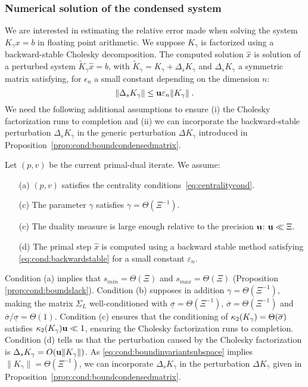 \subsubsection{Numerical solution of the condensed system}
We are interested in estimating the relative error
made when solving the system $K_\gamma x = b$ in floating
point arithmetic. We suppose $K_\gamma$ is factorized using
a backward-stable Cholesky decomposition. The computed
solution $\widehat{x}$ is solution of a perturbed system
$\widetilde{K}_\gamma \widehat{x} = b$, with $\widetilde{K}_\gamma
= K_\gamma + \Delta_s K_\gamma$ and $\Delta_s K_\gamma$ a symmetric matrix satisfying,
for $\epsilon_n$ a small constant depending on the dimension $n$:
\begin{equation}
  \label{eq:cond:backwardstable}
\|\Delta_s K_\gamma\| \leq \mathbf{u} \varepsilon_n \|K_\gamma\| \;.
\end{equation}
We need the following additional assumptions to
ensure (i) the Cholesky factorization runs to completion
and (ii) we can incorporate the backward-stable perturbation $\Delta_s K_\gamma$
in the generic perturbation $\Delta K_\gamma$ introduced in
Proposition~\ref{prop:cond:boundcondensedmatrix}.
\begin{assumption} Let $(p, v)$ be the current primal-dual iterate. We assume:
  \begin{itemize}
    \item[(a)] $(p, v)$ satisfies the centrality conditions~\eqref{eq:centralitycond}.
    \item[(c)] The parameter $\gamma$ satisfies $\gamma = \Theta(\Xi^{-1})$.
    \item[(c)] The duality measure is large enough relative to the precision $\mathbf{u}$: $\mathbf{u} \ll \Xi$.
    \item[(d)] The primal step $\widehat{x}$ is computed using a backward
      stable method satisfying \eqref{eq:cond:backwardstable} for a small constant
      $\varepsilon_n$.
  \end{itemize}
  \label{hyp:cond:wellcond}
\end{assumption}
Condition (a) implies that
$s_{min} = \Theta(\Xi)$ and $s_{max} = \Theta(\Xi)$ (Proposition \ref{prop:cond:boundslack}).
Condition (b) supposes in addition $\gamma = \Theta(\Xi^{-1})$, making
the matrix $\Sigma_L$ well-conditioned with
$\underline{\sigma} = \Theta(\Xi^{-1})$,
$\overline{\sigma} = \Theta(\Xi^{-1})$ and $\overline{\sigma}/\underline{\sigma} = \Theta(1)$.
Condition (c) ensures that the conditioning of $\kappa_2(K_\gamma) = \Theta(\overline{\sigma})$
satisfies $\kappa_2(K_\gamma) \mathbf{u} \ll 1$,
ensuring the Cholesky factorization runs to completion.
Condition (d) tells us that the perturbation caused by the Cholesky
factorization is $\Delta_s K_\gamma = O(\mathbf{u} \| K_\gamma\|)$. As
\eqref{eq:cond:boundinvariantsubspace} implies $\|K_\gamma \| = \Theta(\Xi^{-1})$,
we can incorporate $\Delta_s K_\gamma$ in the perturbation
$\Delta K_\gamma$ given in Proposition~\ref{prop:cond:boundcondensedmatrix}.

